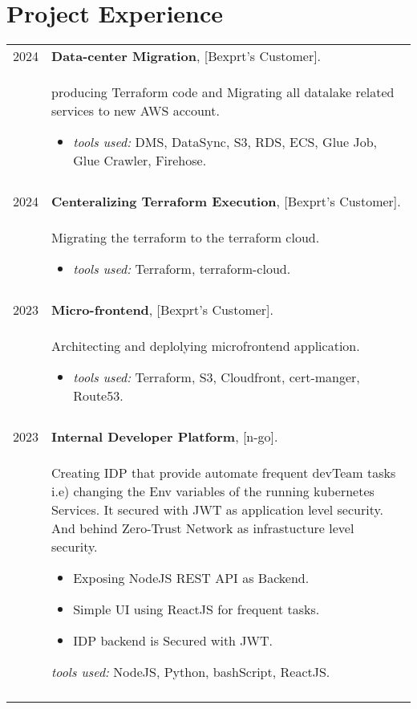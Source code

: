 \documentclass[a4paper,10pt]{article}
\begin{document}
\section{\textbf{Project Experience}}  
    \begin{longtable}{r p{16cm}}

        2024  & \textbf{Data-center Migration}, [Bexprt's Customer].\\&
        producing Terraform code and Migrating all datalake related services to new AWS account.
        \begin{itemize}
            \item \textit{tools used: } DMS, DataSync, S3, RDS, ECS, Glue Job, Glue Crawler, Firehose.
        \end{itemize}\\
        &\\ 
        2024  & \textbf{Centeralizing Terraform Execution}, [Bexprt's Customer].\\&
        Migrating the terraform to the terraform cloud. 
        \begin{itemize}
            \item \textit{tools used: } Terraform, terraform-cloud.
        \end{itemize}\\
        &\\ 

        2023  & \textbf{Micro-frontend}, [Bexprt's Customer].\\&
        Architecting and deplolying microfrontend application.
        \begin{itemize}
            \item \textit{tools used: } Terraform, S3, Cloudfront, cert-manger, Route53.
        \end{itemize}\\
        &\\ 

        2023  & \textbf{Internal Developer Platform}, [n-go].\\&
        Creating IDP that provide automate frequent devTeam tasks i.e) changing the Env variables of the running kubernetes Services. It secured with JWT as application level security. And behind Zero-Trust Network as infrastucture level security.
        \begin{itemize}
            \item Exposing NodeJS REST API as Backend. 
            \item Simple UI using ReactJS for frequent tasks. 
            \item IDP backend is Secured with JWT. 
        \end{itemize}
        \textit{tools used: } NodeJS, Python, bashScript, ReactJS.\\
        &\\ 


\end{longtable}
\end{document}
